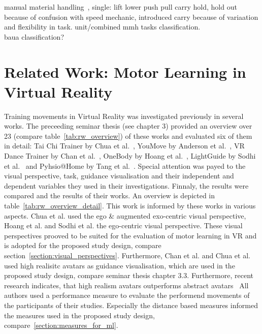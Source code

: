 manual material handling~\cite{mmh}, single: lift lower push pull carry hold, hold out because of confusion with speed mechanic, introduced carry because of variaation and flexibility in task. unit/combined mmh tasks classification.\\
baua classification?



\section{Related Work: Motor Learning in Virtual Reality}
\label{section:related_work}
Training movements in Virtual Reality was investigated previously in several works. The preceeding seminar thesis (see chapter 3) provided an overview over 23 (compare table~\ref{tab:rw_overview}) of these works and evaluated six of them in detail: Tai Chi Trainer by Chua et al.~\cite{thaichichua}, YouMove by Anderson et al.~\cite{YouMove}, VR Dance Trainer by Chan et al.~\cite{vrdancetrainer}, OneBody by Hoang et al.~\cite{onebody}, LightGuide by Sodhi et al.~\cite{lightguide} and Pyhsio@Home by Tang et al.~\cite{physioathome}. Special attention was payed to the visual perspective, task, guidance visualisation and their independent and dependent variables they used in their investigations. Finnaly, the results were compared and the results of their works. An overview is depicted in table~\ref{tab:rw_overview_detail}. This work is informed by these works in various aspects. Chua et al. used the ego \& augmented exo-centric visual perspective, Hoang et al. and Sodhi et al. the ego-centric visual perspective. These visual perspectives prooved to be suited for the evaluation of motor learning in VR and is adopted for the proposed study design, compare section~\ref{section:visual_perspectives}. Furthermore, Chan et al. and Chua et al. used high realisitc avatars as guidance visualisation, which are used in the proposed study design, compare seminar thesis chapter 3.3. Furthermore, recent research indicates, that high realism avatars outperforms abstract avatars~\cite{max,perspectivematters} All authors used a performance measure to evaluate the performend movements of the participants of their studies. Especially the distance based measures informed the measures used in the proposed study design, compare~\ref{section:measures_for_ml}.\\
